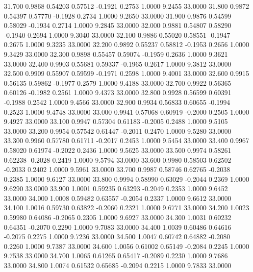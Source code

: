   31.700   0.9868   0.54203   0.57512  -0.1921   0.2753   1.0000   9.2455  33.0000
  31.800   0.9872   0.54397   0.57770  -0.1928   0.2734   1.0000   9.2650  33.0000
  31.900   0.9876   0.54599   0.58029  -0.1934   0.2714   1.0000   9.2845  33.0000
  32.000   0.9881   0.54807   0.58290  -0.1940   0.2694   1.0000   9.3040  33.0000
  32.100   0.9886   0.55020   0.58551  -0.1947   0.2675   1.0000   9.3235  33.0000
  32.200   0.9892   0.55237   0.58812  -0.1953   0.2656   1.0000   9.3429  33.0000
  32.300   0.9898   0.55457   0.59074  -0.1959   0.2636   1.0000   9.3621  33.0000
  32.400   0.9903   0.55681   0.59337  -0.1965   0.2617   1.0000   9.3812  33.0000
  32.500   0.9909   0.55907   0.59599  -0.1971   0.2598   1.0000   9.4001  33.0000
  32.600   0.9915   0.56135   0.59862  -0.1977   0.2579   1.0000   9.4188  33.0000
  32.700   0.9922   0.56365   0.60126  -0.1982   0.2561   1.0000   9.4373  33.0000
  32.800   0.9928   0.56599   0.60391  -0.1988   0.2542   1.0000   9.4566  33.0000
  32.900   0.9934   0.56833   0.60655  -0.1994   0.2523   1.0000   9.4748  33.0000
  33.000   0.9941   0.57068   0.60919  -0.2000   0.2505   1.0000   9.4927  33.0000
  33.100   0.9947   0.57304   0.61183  -0.2005   0.2488   1.0000   9.5105  33.0000
  33.200   0.9954   0.57542   0.61447  -0.2011   0.2470   1.0000   9.5280  33.0000
  33.300   0.9960   0.57780   0.61711  -0.2017   0.2453   1.0000   9.5454  33.0000
  33.400   0.9967   0.58020   0.61974  -0.2022   0.2436   1.0000   9.5625  33.0000
  33.500   0.9974   0.58261   0.62238  -0.2028   0.2419   1.0000   9.5794  33.0000
  33.600   0.9980   0.58503   0.62502  -0.2033   0.2402   1.0000   9.5961  33.0000
  33.700   0.9987   0.58746   0.62765  -0.2038   0.2385   1.0000   9.6127  33.0000
  33.800   0.9994   0.58990   0.63029  -0.2044   0.2369   1.0000   9.6290  33.0000
  33.900   1.0001   0.59235   0.63293  -0.2049   0.2353   1.0000   9.6452  33.0000
  34.000   1.0008   0.59482   0.63557  -0.2054   0.2337   1.0000   9.6612  33.0000
  34.100   1.0016   0.59730   0.63822  -0.2060   0.2321   1.0000   9.6771  33.0000
  34.200   1.0023   0.59980   0.64086  -0.2065   0.2305   1.0000   9.6927  33.0000
  34.300   1.0031   0.60232   0.64351  -0.2070   0.2290   1.0000   9.7083  33.0000
  34.400   1.0039   0.60486   0.64616  -0.2075   0.2275   1.0000   9.7236  33.0000
  34.500   1.0047   0.60742   0.64882  -0.2080   0.2260   1.0000   9.7387  33.0000
  34.600   1.0056   0.61002   0.65149  -0.2084   0.2245   1.0000   9.7538  33.0000
  34.700   1.0065   0.61265   0.65417  -0.2089   0.2230   1.0000   9.7686  33.0000
  34.800   1.0074   0.61532   0.65685  -0.2094   0.2215   1.0000   9.7833  33.0000
